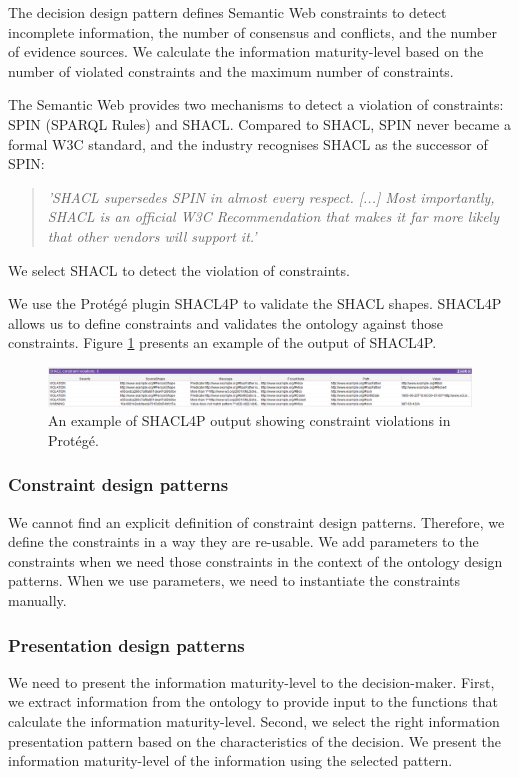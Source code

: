 The decision design pattern defines Semantic Web constraints to detect incomplete information, the number of consensus and conflicts, and the number of evidence sources. We calculate the information maturity-level based on the number of violated constraints and the maximum number of constraints.

The Semantic Web provides two mechanisms to detect a violation of constraints: SPIN (SPARQL Rules) and SHACL. Compared to SHACL, SPIN never became a formal W3C standard, and the industry recognises SHACL as the successor of SPIN:
\begin{quote}\itshape
'SHACL supersedes SPIN in almost every respect. [...] Most importantly, SHACL is an official W3C Recommendation that makes it far more likely that other vendors will support it.' \parencite{WEB14}
\end{quote}

We select SHACL to detect the violation of constraints.

We use the Prot\'eg\'e plugin SHACL4P \parencite{SM25} to validate the SHACL shapes. SHACL4P allows us to define constraints and validates the ontology against those constraints. Figure \ref{fig:shacl-output} presents an example of the output of SHACL4P. 

\begin{figure}[H]
\centering
  \includegraphics[width=17cm]{../../Images/SHACL4P_Example.png}
  \caption{An example of SHACL4P output showing constraint violations in Prot\'eg\'e.}
  \label{fig:shacl-output}
\end{figure}

\subsubsection{Constraint design patterns}
We cannot find an explicit definition of constraint design patterns. Therefore, we define the constraints in a way they are re-usable. We add parameters to the constraints when we need those constraints in the context of the ontology design patterns. When we use parameters, we need to instantiate the constraints manually. 

\subsubsection{Presentation design patterns} \label{meth_presentation}
We need to present the information maturity-level to the decision-maker. First, we extract information from the ontology to provide input to the functions that calculate the information maturity-level. Second, we select the right information presentation pattern based on the characteristics of the decision. We present the information maturity-level of the information using the selected pattern. 

